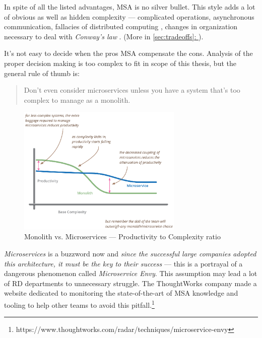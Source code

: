 \documentclass[thesis=M,english,hidelinks]{FITthesis}[2012/10/20]
\newcommand*{\fullref}[1]{\hyperref[{#1}]{\autoref*{#1}: \textit{\nameref*{#1}}}}
\begin{document}
In spite of all the listed advantages, \acrlong{MSA} is no silver bullet. This style adds a lot of obvious as well as hidden complexity --- complicated operations, asynchronous communication, fallacies of distributed computing \cite{devops-fallacies}, changes in organization necessary to deal with \textit{Conway's law} \cite{conways-law}. (More in \fullref{sec:tradeoffs}).

It's not easy to decide when the pros \acrshort{MSA} compensate the cons. Analysis of the proper decision making is too complex to fit in scope of this thesis, but the general rule of thumb is:
\begin{quote}
    Don't even consider microservices unless you have a system that's too complex to manage as a monolith.~\cite{ms-fow-monolith-first}
\end{quote}

\begin{figure}
  \centering
    \includegraphics[width=0.7\textwidth]{images/microservices_productivity.png}
    \caption{Monolith vs. Microservices --- Productivity to Complexity ratio~\cite{ms-fow-monolith-first}}
    \label{fig:microservices_productivity}
\end{figure}


\textit{Microservices} is a buzzword now and \textit{since the successful large companies adopted this architecture, it must be the key to their success} --- this is a portrayal of a dangerous phenomenon called \textit{Microservice Envy}. This assumption may lead a lot of \acrshort{RD} departments to unnecessary struggle. The ThoughtWorks company made a website dedicated to monitoring the state-of-the-art of \acrshort{MSA} knowledge and tooling to help other teams to avoid this pitfall.\footnote{https://www.thoughtworks.com/radar/techniques/microservice-envy}
\end{document}
